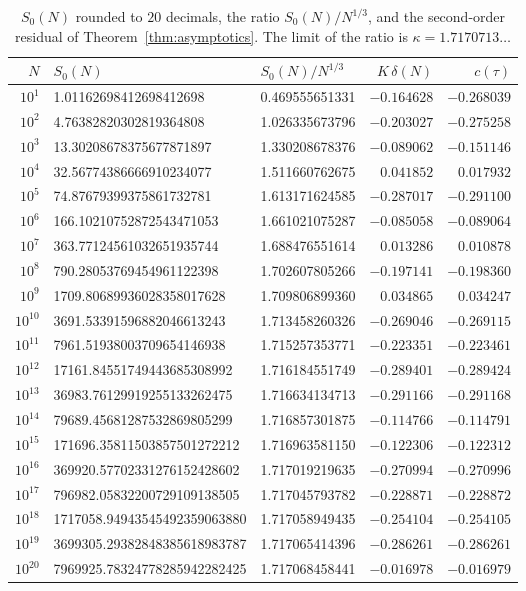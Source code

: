 \documentclass[11pt]{article}
\theoremstyle{definition}
\theoremstyle{remark}
\begin{document}
\begin{table}[!htb]
\centering
\small
\begin{tabular}{rllrr}
\toprule
$N$ & $S_0(N)$ & $S_0(N)/N^{1/3}$ & $K\,\delta(N)$ & $c(\tau)$\\
\midrule
$10^{1}$ & 1.01162698412698412698 & 0.469555651331 & $-0.164628$ & $-0.268039$ \\
$10^{2}$ & 4.76382820302819364808 & 1.026335673796 & $-0.203027$ & $-0.275258$ \\
$10^{3}$ & 13.30208678375677871897 & 1.330208678376 & $-0.089062$ & $-0.151146$ \\
$10^{4}$ & 32.56774386666910234077 & 1.511660762675 & $0.041852$ & $0.017932$ \\
$10^{5}$ & 74.87679399375861732781 & 1.613171624585 & $-0.287017$ & $-0.291100$ \\
$10^{6}$ & 166.10210752872543471053 & 1.661021075287 & $-0.085058$ & $-0.089064$ \\
$10^{7}$ & 363.77124561032651935744 & 1.688476551614 & $0.013286$ & $0.010878$ \\
$10^{8}$ & 790.28053769454961122398 & 1.702607805266 & $-0.197141$ & $-0.198360$ \\
$10^{9}$ & 1709.80689936028358017628 & 1.709806899360 & $0.034865$ & $0.034247$ \\
$10^{10}$ & 3691.53391596882046613243 & 1.713458260326 & $-0.269046$ & $-0.269115$ \\
$10^{11}$ & 7961.51938003709654146938 & 1.715257353771 & $-0.223351$ & $-0.223461$ \\
$10^{12}$ & 17161.84551749443685308992 & 1.716184551749 & $-0.289401$ & $-0.289424$ \\
$10^{13}$ & 36983.76129919255133262475 & 1.716634134713 & $-0.291166$ & $-0.291168$ \\
$10^{14}$ & 79689.45681287532869805299 & 1.716857301875 & $-0.114766$ & $-0.114791$ \\
$10^{15}$ & 171696.35811503857501272212 & 1.716963581150 & $-0.122306$ & $-0.122312$ \\
$10^{16}$ & 369920.57702331276152428602 & 1.717019219635 & $-0.270994$ & $-0.270996$ \\
$10^{17}$ & 796982.05832200729109138505 & 1.717045793782 & $-0.228871$ & $-0.228872$ \\
$10^{18}$ & 1717058.94943545492359063880 & 1.717058949435 & $-0.254104$ & $-0.254105$ \\
$10^{19}$ & 3699305.29382848385618983787 & 1.717065414396 & $-0.286261$ & $-0.286261$ \\
$10^{20}$ & 7969925.78324778285942282425 & 1.717068458441 & $-0.016978$ & $-0.016979$ \\
\bottomrule
\end{tabular}
\caption{$S_0(N)$ rounded to $20$ decimals, the ratio $S_0(N)/N^{1/3}$,
and the second-order residual of Theorem~\ref{thm:asymptotics}. The
limit of the ratio is $\kappa=1.7170713\ldots$}
\label{tab:S}
\end{table}
\end{document}
